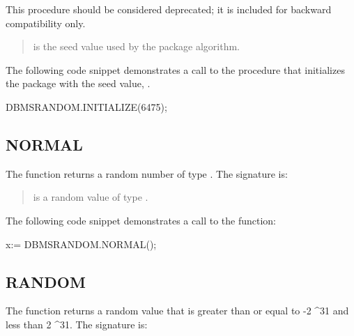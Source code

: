 \documentclass[letterpaper,10pt,english,openany,oneside]{sphinxmanual}
\begin{document}
This procedure should be considered deprecated; it is included for
backward compatibility only.


\begin{quote}

 is the seed value used by the  package algorithm.
\end{quote}


The following code snippet demonstrates a call to the 
procedure that initializes the  package with the seed value,
.

%
\begin{sphinxVerbatim}[commandchars=\\\{\}]
DBMS\PYGZus{}RANDOM.INITIALIZE(6475);
\end{sphinxVerbatim}


\subsection{NORMAL}
\label{\detokenize{dbms_random:normal}}
The  function returns a random number of type . The
signature is:
\begin{quote}

\end{quote}


\begin{quote}

 is a random value of type .
\end{quote}


The following code snippet demonstrates a call to the  function:

%
\begin{sphinxVerbatim}[commandchars=\\\{\}]
x:= DBMS\PYGZus{}RANDOM.NORMAL();
\end{sphinxVerbatim}


\subsection{RANDOM}
\label{\detokenize{dbms_random:random}}
The  function returns a random  value that is greater than
or equal to -2 \textasciicircum{}31 and less than 2 \textasciicircum{}31. The signature is:
\begin{quote}

\end{quote}
\end{document}

